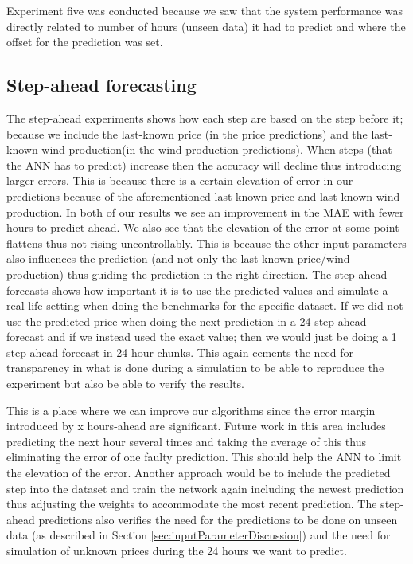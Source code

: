 Experiment five was conducted because we saw that the system performance was directly related to number of hours (unseen data) it had to predict and where the offset for the prediction was set.
\subsection{Step-ahead forecasting}
\label{sec:stepAheadDiscussion}
The step-ahead experiments shows how each step are based on the step before it; because we include the last-known price (in the price predictions) and the last-known wind production(in the wind production predictions). When steps (that the ANN has to predict) increase then the accuracy will decline thus introducing larger errors. This is because there is a certain elevation of error in our predictions because of the aforementioned last-known price and last-known wind production. In both of our results we see an improvement in the MAE with fewer hours to predict ahead. We also see that the elevation of the error at some point flattens thus not rising uncontrollably. This is because the other input parameters also influences the prediction (and not only the last-known price/wind production) thus guiding the prediction in the right direction. The step-ahead forecasts shows how important it is to use the predicted values and simulate a real life setting when doing the benchmarks for the specific dataset. If we did not use the predicted price when doing the next prediction in a 24 step-ahead forecast and if we instead used the exact value; then we would just be doing a 1 step-ahead forecast in 24 hour chunks. This again cements the need for transparency in what is done during a simulation to be able to reproduce the experiment but also be able to verify the results.

This is a place where we can improve our algorithms since the error margin introduced by x hours-ahead are significant. Future work in this area includes predicting the next hour several times and taking the average of this thus eliminating the error of one faulty prediction. This should help the ANN to limit the elevation of the error. Another approach would be to include the predicted step into the dataset and train the network again including the newest prediction thus adjusting the weights to accommodate the most recent prediction. The step-ahead predictions also verifies the need for the predictions to be done on unseen data (as described in Section \ref{sec:inputParameterDiscussion}) and the need for simulation of unknown prices during the 24 hours we want to predict. 

